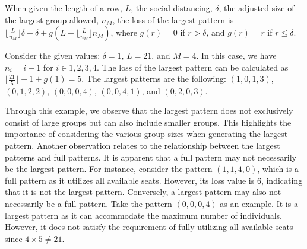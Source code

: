 \begin{prop}\label{lem_pattern}
When given the length of a row, $L$, the social distancing, $\delta$, the adjusted size of the largest group allowed, $n_M$, the loss of the largest pattern is $\lfloor \frac{L}{n_M} \rfloor \delta - \delta + g(L - \lfloor \frac{L}{n_M} \rfloor n_M)$, where $g(r) = 0$ if $r > \delta$, and $g(r) = r$ if $r \leq \delta$.
\end{prop}

\begin{example}
Consider the given values: $\delta = 1$, $L = 21$, and $M = 4$. In this case, we have $n_i = i + 1$ for $i \in {1, 2, 3, 4}$. The loss of the largest pattern can be calculated as $\lfloor \frac{21}{5} \rfloor - 1 + g(1) = 5$. The largest patterns are the following: $(1, 0, 1, 3)$, $(0, 1, 2, 2)$, $(0, 0, 0, 4)$, $(0, 0, 4, 1)$, and $(0, 2, 0, 3)$. 
\end{example}


Through this example, we observe that the largest pattern does not exclusively consist of large groups but can also include smaller groups. This highlights the importance of considering the various group sizes when generating the largest pattern. Another observation relates to the relationship between the largest patterns and full patterns. It is apparent that a full pattern may not necessarily be the largest pattern. For instance, consider the pattern $(1, 1, 4, 0)$, which is a full pattern as it utilizes all available seats. However, its loss value is 6, indicating that it is not the largest pattern. Conversely, a largest pattern may also not necessarily be a full pattern. Take the pattern $(0, 0, 0, 4)$ as an example. It is a largest pattern as it can accommodate the maximum number of individuals. However, it does not satisfy the requirement of fully utilizing all available seats since $4 \times 5 \neq 21$.




